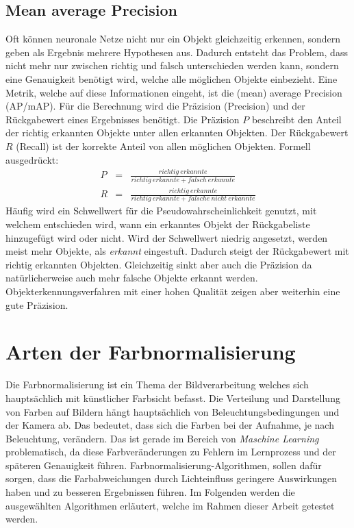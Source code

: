   \subsection{Mean average Precision}\label{s.map}
Oft können neuronale Netze nicht nur ein Objekt gleichzeitig erkennen, sondern geben als Ergebnis mehrere Hypothesen aus. Dadurch entsteht das Problem, dass nicht mehr nur zwischen richtig und falsch unterschieden werden kann, sondern eine Genauigkeit benötigt wird, welche alle möglichen Objekte einbezieht. Eine Metrik, welche auf diese Informationen eingeht, ist die (mean) average Precision (AP/mAP). Für die Berechnung wird die Präzision (Precision) und der Rückgabewert eines Ergebnisses benötigt. Die Präzision $P$ beschreibt den Anteil der richtig erkannten Objekte unter allen erkannten Objekten. Der Rückgabewert $R$ (Recall) ist der korrekte Anteil von allen möglichen Objekten. Formell ausgedrückt:
\begin{eqnarray}
P&=&\frac{richtig\medspace erkannte}{richtig\medspace erkannte + falsch\medspace erkannte}\\
R&=&\frac{richtig\medspace erkannte}{richtig\medspace erkannte + falsche\medspace nicht\medspace erkannte}
\end{eqnarray}
Häufig wird ein Schwellwert für die Pseudowahrscheinlichkeit genutzt, mit welchem entschieden wird, wann ein erkanntes Objekt der Rückgabeliste hinzugefügt wird oder nicht. Wird der Schwellwert niedrig angesetzt, werden meist mehr Objekte, als \textit{erkannt} eingestuft. Dadurch steigt der Rückgabewert mit richtig erkannten Objekten. Gleichzeitig sinkt aber auch die Präzision da natürlicherweise auch mehr falsche Objekte erkannt werden. Objekterkennungsverfahren mit einer hohen Qualität zeigen aber weiterhin eine gute Präzision.
\section{Arten der Farbnormalisierung}\label{s.farbnormalisierungen}  
Die Farbnormalisierung ist ein Thema der Bildverarbeitung welches sich hauptsächlich mit künstlicher Farbsicht befasst. Die Verteilung und Darstellung von Farben auf Bildern hängt hauptsächlich von Beleuchtungsbedingungen und der Kamera ab. Das bedeutet, dass sich die Farben bei der Aufnahme, je nach Beleuchtung, verändern. Das ist gerade im Bereich von \textit{Maschine Learning} problematisch, da diese Farbveränderungen zu Fehlern im Lernprozess und der späteren Genauigkeit führen. Farbnormalisierung-Algorithmen, sollen dafür sorgen, dass die Farbabweichungen durch Lichteinfluss geringere Auswirkungen haben und zu besseren Ergebnissen führen. Im Folgenden werden die ausgewählten Algorithmen erläutert, welche im Rahmen dieser Arbeit getestet werden.
